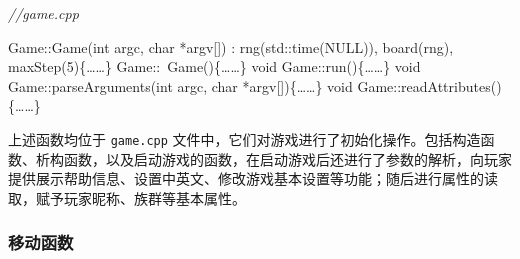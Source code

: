 \documentclass[hyperref,UTF8,a4paper]{ctexart}
\newenvironment{Shaded}{}{}
\newcommand{\BuiltInTok}[1]{#1}
\newcommand{\CommentTok}[1]{\textcolor[rgb]{0.38,0.63,0.69}{\textit{#1}}}
\newcommand{\DataTypeTok}[1]{\textcolor[rgb]{0.56,0.13,0.00}{#1}}
\newcommand{\DecValTok}[1]{\textcolor[rgb]{0.25,0.63,0.44}{#1}}
\newcommand{\NormalTok}[1]{#1}
\begin{document}
\begin{Shaded}
\begin{Highlighting}[]
\CommentTok{//game.cpp}

\NormalTok{Game::Game(}\DataTypeTok{int}\NormalTok{ argc, }\DataTypeTok{char}\NormalTok{ *argv[]) : rng(}\BuiltInTok{std::}\NormalTok{time(NULL)), board(rng), maxStep(}\DecValTok{5}\NormalTok{)\{……\}}
\NormalTok{Game::~Game()\{……\}}
\DataTypeTok{void}\NormalTok{ Game::run()\{……\}}
\DataTypeTok{void}\NormalTok{ Game::parseArguments(}\DataTypeTok{int}\NormalTok{ argc, }\DataTypeTok{char}\NormalTok{ *argv[])\{……\}}
\DataTypeTok{void}\NormalTok{ Game::readAttributes()\{……\}}
\end{Highlighting}
\end{Shaded}

上述函数均位于 \texttt{game.cpp}
文件中，它们对游戏进行了初始化操作。包括构造函数、析构函数，以及启动游戏的函数，在启动游戏后还进行了参数的解析，向玩家提供展示帮助信息、设置中英文、修改游戏基本设置等功能；随后进行属性的读取，赋予玩家昵称、族群等基本属性。

\hypertarget{ux79fbux52a8ux51fdux6570}{%
\subsubsection{移动函数}\label{ux79fbux52a8ux51fdux6570}}
\end{document}
